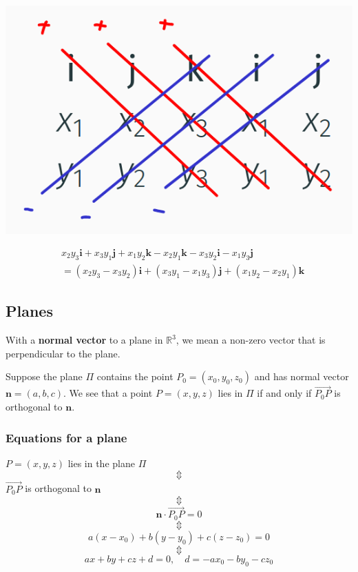 \documentclass[11pt]{article}
\begin{document}
\begin{center}
\includegraphics[scale=1.0]{./images/cross-product.png}
\end{center}
\begin{align*}
&x_2 y_3 \boldsymbol{i} + x_3 y_1 \boldsymbol{j} + x_1 y_2 \boldsymbol{k} - x_2 y_1 \boldsymbol{k} - x_3 y_2 \boldsymbol{i} - x_1 y_3 \boldsymbol{j} \\
&= (x_2 y_3 - x_3 y_2) \boldsymbol{i} + (x_3 y_1 - x_1 y_3) \boldsymbol{j} + (x_1 y_2 - x_2 y_ 1) \boldsymbol{k}
\end{align*}
\subsection{Planes}
\label{sec:orgf92d58b}
With a \textbf{normal vector} to a plane in \(\mathbb{R}^3\), we mean a non-zero vector that is perpendicular to the plane.


Suppose the plane \(\Pi\) contains the point \(P_0 = (x_0, y_0, z_0)\) and has normal vector \(\boldsymbol{n} = (a, b, c)\). We see that a point \(P = (x, y, z)\) lies in \(\Pi\) if and only if \(\overrightarrow{P_0P}\) is orthogonal to \(\boldsymbol{n}\).
\subsubsection{Equations for a plane}
\label{sec:org96a217d}
\begin{center}
\(P = (x, y, z)\) lies in the plane \(\Pi\)
\[\Updownarrow\]
\(\overrightarrow{P_0 P}\) is orthogonal to \(\boldsymbol{n}\)
\[\Updownarrow\]
\[\boldsymbol{n} \cdot \overrightarrow{P_0 P} = 0\]
\[\Updownarrow\]
\[a(x - x_0) + b(y - y_0) + c(z - z_0) = 0\]
\[\Updownarrow\]
\[ax + by + cz + d = 0, \quad d = -ax_0 - by_0 - cz_0\]
\end{center}
\end{document}
